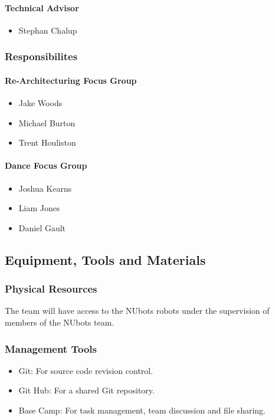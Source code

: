 \documentclass[english,12pt]{scrartcl}
\begin{document}
				\paragraph{Technical Advisor}
					\begin{itemize}
						\item Stephan Chalup
					\end{itemize}
			\subsubsection{Responsibilites}
			
				\paragraph{Re-Architecturing Focus Group}
					\begin{itemize}
						\item Jake Woods
						\item Michael Burton
						\item Trent Houliston
					\end{itemize}
					
				\paragraph{Dance Focus Group}
					\begin{itemize}
						\item Joshua Kearns
						\item Liam Jones
						\item Daniel Gault
					\end{itemize}
					
		\subsection{Equipment, Tools and Materials}
			\subsubsection{Physical Resources}
			The team will have access to the NUbots robots under the supervision of members of the NUbots team.
			\subsubsection{Management Tools}
				\begin{itemize}
					\item Git: For source code revision control.
					\item Git Hub: For a shared Git repository.
					\item Base Camp: For task management, team discussion and file sharing.
				\end{itemize}
				
\end{document}
